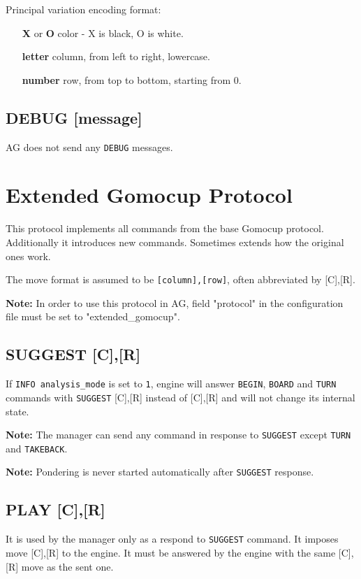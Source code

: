 \documentclass[12pt,a4paper]{article}
\begin{document}
Principal variation encoding format:
\begin{enumerate}[leftmargin=7.5em]
\item[\textbf{X} or \textbf{O}]{color - X is black, O is white.}
\item[\textbf{letter}]{column, from left to right, lowercase.}
\item[\textbf{number}]{row, from top to bottom, starting from 0.}
\end{enumerate}


\subsection{DEBUG [message]}
\label{cmd_debug}
AG does not send any \texttt{DEBUG} messages.


\newpage
\section{Extended Gomocup Protocol}
This protocol implements all commands from the base Gomocup protocol. Additionally it introduces new commands. Sometimes extends how the original ones work.

The move format is assumed to be \texttt{[column],[row]}, often abbreviated by [C],[R].

\textbf{Note:} In order to use this protocol in AG, field "protocol" in the configuration file must be set to "extended{\_}gomocup".

\subsection{SUGGEST [C],[R]}
\label{cmd_suggest}
If \texttt{INFO analysis{\_}mode} is set to \texttt{1}, engine will answer \texttt{BEGIN}, \texttt{BOARD} and \texttt{TURN} commands with \texttt{SUGGEST} [C],[R] instead of [C],[R] and will not change its internal state.

\textbf{Note:} The manager can send any command in response to \texttt{SUGGEST} except \texttt{TURN} and \texttt{TAKEBACK}.

\textbf{Note:} Pondering is never started automatically after \texttt{SUGGEST} response.


\subsection{PLAY [C],[R]}
\label{cmd_play}
It is used by the manager only as a respond to \texttt{SUGGEST} command. It imposes move [C],[R] to the engine. It must be answered by the engine with the same [C],[R] move as the sent one.
\end{document}
